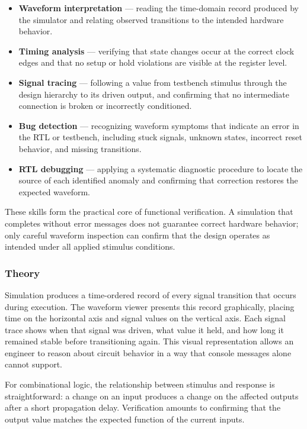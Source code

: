 \begin{itemize}
    \item \textbf{Waveform interpretation} — reading the time-domain record
          produced by the simulator and relating observed transitions to the
          intended hardware behavior.
    \item \textbf{Timing analysis} — verifying that state changes occur at
          the correct clock edges and that no setup or hold violations are
          visible at the register level.
    \item \textbf{Signal tracing} — following a value from testbench stimulus
          through the design hierarchy to its driven output, and confirming
          that no intermediate connection is broken or incorrectly conditioned.
    \item \textbf{Bug detection} — recognizing waveform symptoms that indicate
          an error in the RTL or testbench, including stuck signals, unknown
          states, incorrect reset behavior, and missing transitions.
    \item \textbf{RTL debugging} — applying a systematic diagnostic procedure
          to locate the source of each identified anomaly and confirming that
          correction restores the expected waveform.
\end{itemize}

These skills form the practical core of functional verification. A simulation
that completes without error messages does not guarantee correct hardware
behavior; only careful waveform inspection can confirm that the design operates
as intended under all applied stimulus conditions.

\subsubsection{Theory}
\label{sec:sim-lab-theory}

Simulation produces a time-ordered record of every signal transition that
occurs during execution. The waveform viewer presents this record graphically,
placing time on the horizontal axis and signal values on the vertical axis.
Each signal trace shows when that signal was driven, what value it held, and
how long it remained stable before transitioning again. This visual
representation allows an engineer to reason about circuit behavior in a way
that console messages alone cannot support.

For combinational logic, the relationship between stimulus and response is
straightforward: a change on an input produces a change on the affected outputs
after a short propagation delay. Verification amounts to confirming that the
output value matches the expected function of the current inputs.

